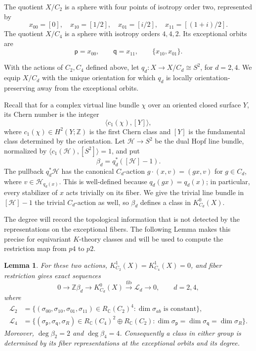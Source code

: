 \documentclass[11pt]{amsart}
\newcommand{\Z}{\mathbb Z}
\newcommand{\C}{\mathbb C}
\newcommand{\Rep}{R_{\C}}
\newcommand{\degc}{\operatorname{deg}}
\newtheorem{lemma}[theorem]{Lemma}
\theoremstyle{remark}
\numberwithin{equation}{section}
\begin{document}
The quotient $X/C_2$ is a sphere with four points of isotropy order two, represented by
\[
 x_{00}=[0],\quad x_{10}=[1/2],\quad
 x_{01}=[i/2],\quad x_{11}=[(1+i)/2].
\]
The quotient $X/C_4$ is a sphere with isotropy orders $4,4,2$. Its exceptional orbits are
\[
 \mathsf p=x_{00},\qquad \mathsf q=x_{11},\qquad
 \{x_{10},x_{01}\}.
\]

With the actions of $C_2,C_4$ defined above, let $q_d\colon X\to X/C_d\cong S^2$, for $d=2,4$. We equip $X/C_d$ with the unique orientation for which $q_d$ is locally orientation-preserving away from the exceptional orbits. 

Recall that for a complex virtual line bundle $\chi$ over an oriented closed surface $Y$, its Chern number is the integer
\[
 \langle c_1(\chi),[Y]\rangle,
\]
where $c_1(\chi)\in H^2(Y;\Z)$ is the first Chern class and $[Y]$ is the fundamental class determined by the orientation. Let $\mathcal H\to S^2$ be the dual Hopf line bundle, normalized by $\langle c_1(\mathcal H),[S^2]\rangle=1$, and put
\[
 \beta_d=q_d^*([\mathcal H]-1).
\]
The pullback $q_d^*\mathcal{H}$ has the canonical $C_d$-action
$g\cdot(x,v)=(gx,v)$ for $g\in C_d$, where
$v\in\mathcal{H}_{q_d(x)}$. This is well-defined because
$q_d(gx)=q_d(x)$; in particular, every stabilizer of $x$ acts trivially
on its fiber. We give the trivial line bundle in $[\mathcal{H}]-1$ the
trivial $C_d$-action as well, so $\beta_d$ defines a class in
$K^0_{C_d}(X)$. 

The degree will record the topological information that is not detected by
the representations on the exceptional fibers. The following
Lemma makes this precise for equivariant
$K$-theory classes and will be used to compute the restriction map from
$p4$ to $p2$.
\begin{lemma}\label{lem:surface-basis}
For these two actions, $K_{C_2}^1(X)=K_{C_4}^1(X)=0$, and fiber restriction gives exact sequences
\begin{equation}\label{eq:fiber-sequence}
 0\longrightarrow\Z\beta_d\longrightarrow K_{C_d}^0(X)
 \xrightarrow{\mathrm{fib}}\mathcal L_d\longrightarrow0,
 \qquad d=2,4,
\end{equation}
where
\[
\begin{aligned}
 \mathcal L_2&=\{(\sigma_{00},\sigma_{10},\sigma_{01},\sigma_{11})
 \in\Rep(C_2)^4:\dim\sigma_{ab}\text{ is constant}\},\\
 \mathcal L_4&=\{(\sigma_{\mathsf p},\sigma_{\mathsf q},\sigma_R)
 \in\Rep(C_4)^2\oplus\Rep(C_2):
 \dim\sigma_{\mathsf p}=\dim\sigma_{\mathsf q}=\dim\sigma_R\}.
\end{aligned}
\]
Moreover, $\degc\beta_2=2$ and $\degc\beta_4=4$. Consequently a class in either group is determined by its fiber representations at the exceptional orbits and its degree.
\end{lemma}
\end{document}
